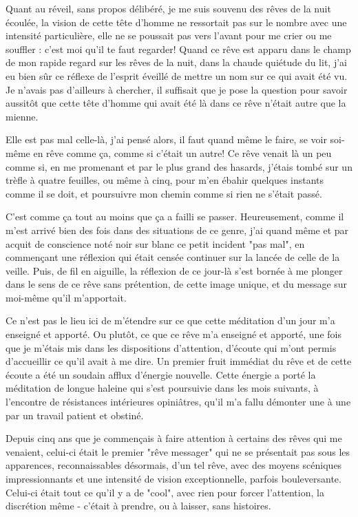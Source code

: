 Quant au réveil, sans propos délibéré, je me suis souvenu des rêves de la nuit écoulée, la vision de cette tête d'homme ne ressortait pas sur le nombre avec une intensité particulière, elle ne se poussait pas vers l'avant pour me crier ou me souffler : c'est moi qu'il te faut regarder! Quand ce rêve est apparu dans le champ de mon rapide regard sur les rêves de la nuit, dans la chaude quiétude du lit, j'ai eu bien sûr ce réflexe de l'esprit éveillé de mettre un nom sur ce qui avait été vu. Je n'avais pas d'ailleurs à chercher, il suffisait que je pose la question pour savoir aussitôt que cette tête d'homme qui avait été là dans ce rêve n'était autre que la mienne.

Elle est pas mal celle-là, j'ai pensé alors, il faut quand même le faire, se voir soi-même en rêve comme ça, comme si c'était un autre! Ce rêve venait là un peu comme si, en me promenant et par le plus grand des hasards, j'étais tombé sur un trèfle à quatre feuilles, ou même à cinq, pour m'en ébahir quelques instants comme il se doit, et poursuivre mon chemin comme si rien ne s'était passé.

C'est comme ça tout au moins que ça a failli se passer. Heureusement, comme il m'est arrivé bien des fois dans des situations de ce genre, j'ai quand même et par acquit de conscience noté noir sur blanc ce petit incident "pas mal", en commençant une réflexion qui était censée continuer sur la lancée de celle de la veille. Puis, de fil en aiguille, la réflexion de ce jour-là s'est bornée à me plonger dans le sens de ce rêve sans prétention, de cette image unique, et du message sur moi-même qu'il m'apportait.

Ce n'est pas le lieu ici de m'étendre sur ce que cette méditation d'un jour m'a enseigné et apporté. Ou plutôt, ce que ce rêve m'a enseigné et apporté, une fois que je m'étais mis dans les dispositions d'attention, d'écoute qui m'ont permis d'accueillir ce qu'il avait à me dire. Un premier fruit immédiat du rêve et de cette écoute a été un soudain afflux d'énergie nouvelle. Cette énergie a porté la méditation de longue haleine qui s'est poursuivie dans les mois suivants, à l'encontre de résistances intérieures opiniâtres, qu'il m'a fallu démonter une à une par un travail patient et obstiné.

Depuis cinq ans que je commençais à faire attention à certains des rêves qui me venaient, celui-ci était le premier "rêve messager" qui ne se présentait pas sous les apparences, reconnaissables désormais, d'un tel rêve, avec des moyens scéniques impressionnants et une intensité de vision exceptionnelle, parfois bouleversante. Celui-ci était tout ce qu'il y a de "cool", avec rien pour forcer l'attention, la discrétion même - c'était à prendre, ou à laisser, sans histoires.

